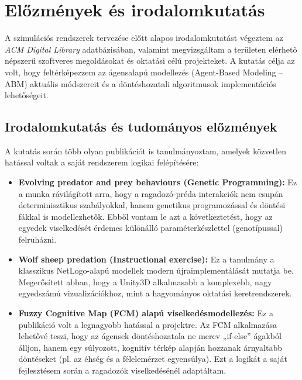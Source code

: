 \chapter{Előzmények és irodalomkutatás}
\label{chap:irodalom}

A szimulációs rendszerek tervezése előtt alapos irodalomkutatást végeztem az \textit{ACM Digital Library} adatbázisában, valamint megvizsgáltam a területen elérhető népszerű szoftveres megoldásokat és oktatási célú projekteket. A kutatás célja az volt, hogy feltérképezzem az ágensalapú modellezés (Agent-Based Modeling – ABM) aktuális módszereit és a döntéshozatali algoritmusok implementációs lehetőségeit.

\section{Irodalomkutatás és tudományos előzmények}

A kutatás során több olyan publikációt is tanulmányoztam, amelyek közvetlen hatással voltak a saját rendszerem logikai felépítésére:

\begin{itemize}
    \item \textbf{Evolving predator and prey behaviours (Genetic Programming):} Ez a munka rávilágított arra, hogy a ragadozó-préda interakciók nem csupán determinisztikus szabályokkal, hanem genetikus programozással és döntési fákkal is modellezhetők. Ebből vontam le azt a következtetést, hogy az egyedek viselkedését érdemes különálló paraméterkészlettel (genotípussal) felruházni.

    \item \textbf{Wolf sheep predation (Instructional exercise):} Ez a tanulmány a klasszikus NetLogo-alapú modellek modern újraimplementálását mutatja be. Megerősített abban, hogy a Unity3D alkalmasabb a komplexebb, nagy egyedszámú vizualizációkhoz, mint a hagyományos oktatási keretrendszerek.
    
    \item \textbf{Fuzzy Cognitive Map (FCM) alapú viselkedésmodellezés:} Ez a publikáció volt a legnagyobb hatással a projektre. Az FCM alkalmazása lehetővé teszi, hogy az ágensek döntéshozatala ne merev „if-else” ágakból álljon, hanem egy súlyozott, kognitív térkép alapján hozzanak árnyaltabb döntéseket (pl. az éhség és a félelemérzet egyensúlya). Ezt a logikát a saját fejlesztésem során a ragadozók viselkedésénél adaptáltam.
\end{itemize}

